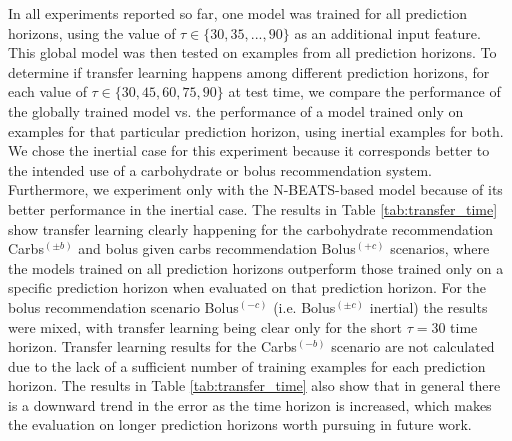 \documentclass[journal,article,submit,moreauthors,pdftex]{Definitions/mdpi}
\begin{document}

In all experiments reported so far, one model was trained for all prediction horizons, using the value of $\tau \in \{30, 35, ..., 90\}$ as an additional input feature. This global model was then tested on examples from all prediction horizons. To determine if transfer learning happens among different prediction horizons, for each value of $\tau \in \{30, 45, 60, 75, 90\}$ at test time, we compare the performance of the globally trained model vs. the performance of a model trained only on examples for that particular prediction horizon, using inertial examples for both. We chose the inertial case for this experiment because it corresponds better to the intended use of a carbohydrate or bolus recommendation system. Furthermore, we experiment only with the N-BEATS-based model because of its better performance in the inertial case. The results in Table \ref{tab:transfer_time} show transfer learning clearly happening for the carbohydrate recommendation Carbs$^{(\pm b)}$ and bolus given carbs recommendation Bolus$^{(+c)}$ scenarios, where the models trained on all prediction horizons outperform those trained only on a specific prediction horizon when evaluated on that prediction horizon. For the bolus recommendation scenario Bolus$^{(-c)}$ (i.e. Bolus$^{(\pm c)}$ inertial) the results were mixed, with transfer learning being clear only for the short $\tau = 30$ time horizon. Transfer learning results for the Carbs$^{(-b)}$ scenario are not calculated due to the lack of a sufficient number of training examples for each prediction horizon. The results in Table \ref{tab:transfer_time} also show that in general there is a downward trend in the error as the time horizon is increased, which makes the evaluation on longer prediction horizons worth pursuing in future work.
\end{document}
